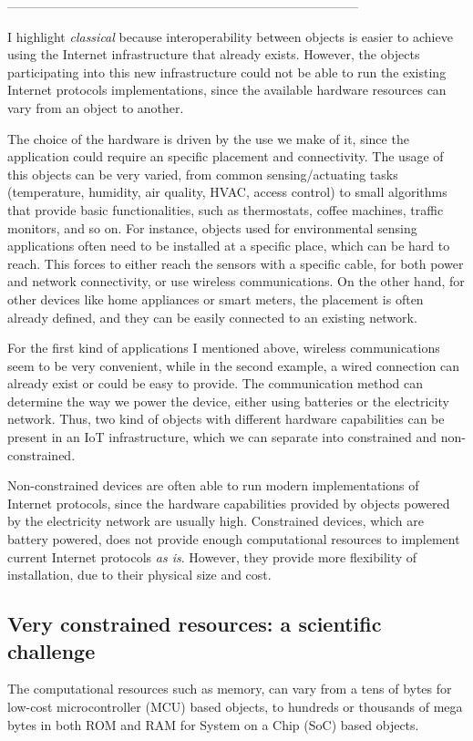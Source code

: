 -----------------------------------------------------------------------------------

I highlight \textit{classical} because interoperability between objects is easier to achieve using the Internet infrastructure that already exists.
However, the objects participating into this new infrastructure could not be able  to run the existing Internet protocols implementations, since the available hardware resources can vary from an object to another.

The choice of the hardware is driven by the use we make of it, since the application could require an specific placement and connectivity.
The usage of this objects can be very varied, from common sensing/actuating tasks (temperature, humidity, air quality, HVAC, access control) to small algorithms that provide basic functionalities, such as thermostats, coffee machines, traffic monitors, and so on.
For instance, objects used for environmental sensing applications often need to be installed at a specific place\cite{younis2008placement}, which can be hard to reach. 
This forces to either reach the sensors with a specific cable, for both power and network connectivity, or use wireless communications.
On the other hand, for other devices like home appliances or smart meters, the placement is often already defined, and they can be easily connected to an existing network.

For the first kind of applications I mentioned above, wireless communications seem to be very convenient, while in the second example, a wired connection can already exist or could be easy to provide.
The communication method can determine the way we power the device, either using batteries or the electricity network.
Thus, two kind of objects with different hardware capabilities can be present in an IoT infrastructure, which we can separate into constrained and non-constrained.

Non-constrained devices\cite{RPi} are often able to run modern implementations of Internet protocols, since the hardware capabilities provided by objects powered by the electricity network are usually high.
Constrained devices\cite{iotlab-m3}, which are battery powered, does not provide enough computational resources to implement current Internet protocols \textit{as is}.
However, they provide more flexibility of installation, due to their physical size and cost.

\subsection{Very constrained resources: a scientific challenge}
The computational resources such as memory, can vary from a tens of bytes for low-cost microcontroller (MCU) based objects, to hundreds or thousands of mega bytes in both ROM and RAM for System on a Chip (SoC) based objects.

